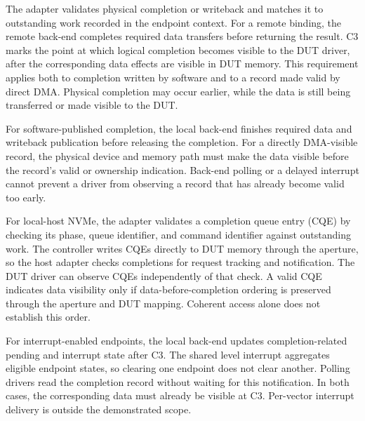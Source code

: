 The adapter validates physical completion or writeback and matches it to
outstanding work recorded in the endpoint context. For a remote binding,
the remote back-end completes required data transfers before returning the
result. C3 marks the point at which logical completion becomes visible to
the DUT driver, after the corresponding data effects are visible in DUT
memory. This requirement applies both to completion written by software
and to a record made valid by direct DMA. Physical completion may occur
earlier, while the data is still being transferred or made visible to the DUT.

For software-published completion, the local back-end finishes required
data and writeback publication before releasing the completion. For a
directly DMA-visible record, the physical device and memory path must make
the data visible before the record's valid or ownership indication.
Back-end polling or a delayed interrupt cannot prevent a driver from
observing a record that has already become valid too early.

For local-host NVMe, the adapter validates a completion queue entry (CQE)
by checking its phase, queue identifier, and command identifier against
outstanding work. The controller writes CQEs directly to DUT memory through
the aperture, so the host adapter checks completions for request tracking
and notification. The DUT driver can observe CQEs independently of that
check. A valid CQE indicates data visibility only if data-before-completion
ordering is preserved through the aperture and DUT mapping. Coherent
access alone does not establish this order.

For interrupt-enabled endpoints, the local back-end updates completion-related
pending and interrupt state after C3. The shared level interrupt aggregates
eligible endpoint states, so clearing one endpoint does not clear another.
Polling drivers read the completion record without waiting for this
notification. In both cases, the corresponding data must already be visible
at C3. Per-vector interrupt delivery is outside the demonstrated scope.
